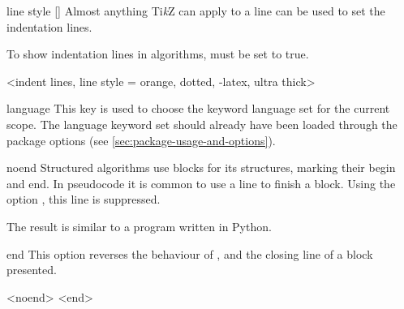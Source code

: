 \documentclass[a4paper, 11pt]{article}
\begin{document}
\begin{option}{line style}{}
    []%
    Almost anything Ti\emph{k}Z can apply to a line can be used to set the indentation lines.

    To show indentation lines in algorithms,  must be set to true.
\end{option}

\begin{tcblisting}{}
    \begin{algorithmic}<indent lines, line style = {orange, dotted, -latex, ultra thick}>
                \EndIf
            \EndFor
        \EndFor
    \end{algorithmic}
\end{tcblisting}


\begin{option}{language}{}
    This key is used to choose the keyword language set for the current scope. The language keyword set should already have been loaded through the package options (see \cref{sec:package-usage-and-options}).
\end{option}

\begin{option}{noend}{}
    Structured algorithms use blocks for its structures, marking their begin and end. In pseudocode it is common to use a line to finish a block.
    Using the option , this line is suppressed.

    The result is similar to a program written in Python.
\end{option}


\begin{option}{end}{}
    This option reverses the behaviour of , and the closing line of a block presented.
\end{option}

\begin{tcblisting}{}
    \begin{algorithmic}<noend>
                <end>
                \EndIf
            \EndFor
        \EndFor
    \end{algorithmic}
\end{tcblisting}
\end{document}

